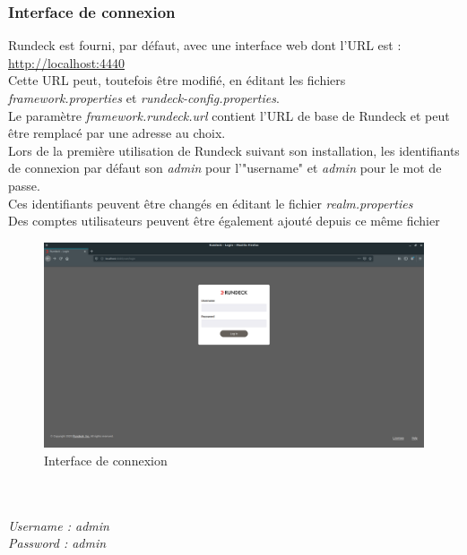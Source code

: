 \documentclass[12pt]{article}
\begin{document}
\subsubsection{Interface de connexion}
Rundeck est fourni, par défaut, avec une interface web dont l'URL est : 
\\
\underline{\url{http://localhost:4440}}
\vspace{0.2cm}
\\
Cette URL peut, toutefois être modifié, en éditant les fichiers \textit{framework.properties} et \textit{rundeck-config.properties}.
\\
Le paramètre \textit{framework.rundeck.url} contient l'URL de base de Rundeck et peut être remplacé par une adresse au choix.
\\
Lors de la première utilisation de Rundeck suivant son installation, les identifiants de connexion par défaut son \textit{admin} pour l'"username" et \textit{admin} pour le mot de passe.
\\
Ces identifiants peuvent être changés en éditant le fichier \textit{realm.properties}
\\
Des comptes utilisateurs peuvent être également ajouté depuis ce même fichier
\\
\begin{figure}[ht]
    \includegraphics[scale=0.23]{images/connexion.png}
    \caption{Interface de connexion}
\end{figure}
\\
\vspace{0.5cm}
\\
\textit{Username : admin}
\\
\textit{Password : admin}
\end{document}
